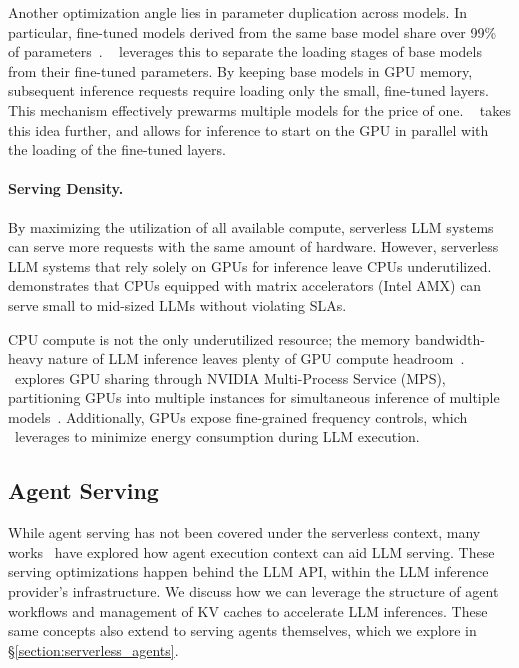 Another optimization angle lies in parameter duplication across models.
In particular, fine-tuned models derived from the same base model share over 99\% of parameters~\cite{serverlesslora}.
\ServerlessLoRA~\cite{serverlesslora} leverages this to separate the loading stages of base models from their fine-tuned parameters.
By keeping base models in GPU memory, subsequent inference requests require loading only the small, fine-tuned layers.
This mechanism effectively prewarms multiple models for the price of one.
\PipeBoost~\cite{pipeboost} takes this idea further, and allows for inference to start on the GPU in parallel with the loading of the fine-tuned layers.

\paragraph{Serving Density.}
By maximizing the utilization of all available compute, serverless LLM systems can serve more requests with the same amount of hardware. 
However, serverless LLM systems that rely solely on GPUs for inference leave CPUs underutilized.
\SLINFER~\cite{slinfer} demonstrates that CPUs equipped with matrix accelerators (Intel AMX) can serve small to mid-sized LLMs without violating SLAs.

CPU compute is not the only underutilized resource; the memory bandwidth-heavy nature of LLM inference leaves plenty of GPU compute headroom~\cite{llama3}.
\WAGES~explores GPU sharing through NVIDIA Multi-Process Service (MPS), partitioning GPUs into multiple instances for simultaneous inference of multiple models~\cite{wages}.
Additionally, GPUs expose fine-grained frequency controls, which \WAGES~leverages to minimize energy consumption during LLM execution.

\subsection{Agent Serving}

\newcommand{\helium}{\textsc{Helium}}
\newcommand{\cortex}{\textsc{Cortex}}
\newcommand{\parrot}{\textsc{Parrot}}
\newcommand{\autellix}{\textsc{Autellix}}
\newcommand{\halo}{\textsc{Halo}}

While agent serving has not been covered under the serverless context, many works~\cite{lin2024parrotefficientservingllmbased, luo2025autellixefficientservingengine, wadlom2026efficientllmservingagentic,
pagonas2025cortexworkflowawareresourcepooling,luo2025autellixefficientservingengine} have explored how agent execution context can aid LLM serving.
These serving optimizations happen behind the LLM API, within the LLM inference provider's infrastructure.
We discuss how we can leverage the structure of agent workflows and management of KV caches to accelerate LLM inferences.
These same concepts also extend to serving agents themselves, which we explore in \S\ref{section:serverless_agents}.

